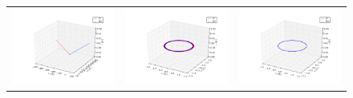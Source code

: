 \documentclass{article}
\begin{document}
\begin{multicols}{2}
\begin{figure}
\begin{center}
\begin{tabular}{ccc}
	\includegraphics[width=60mm]{Images/Earth-Sun/EarthSun_orbit_05_tfinal50.png}
	& \includegraphics[width=60mm]{Images/Earth-Sun/EarthSun_orbit_005_tfinal50.png}
	& \includegraphics[width=60mm]{Images/Earth-Sun/EarthSun_orbit_0005_tfinal50.png} \\
	

\end{tabular}
\end{center}
\end{figure}
\end{multicols}
\end{document}
